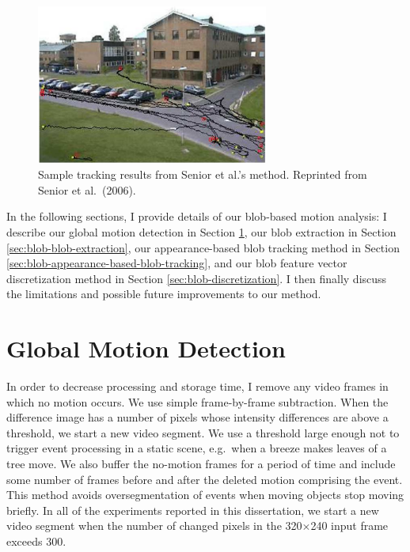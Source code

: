 \begin{figure}[t]
  \centering
  \includegraphics[width=3in]{figures/senior-tracking-results-for-dataset-1.png}
  \caption[Sample tracking results from Senior et al.'s
    method.]{\small Sample tracking results from Senior et al.'s
    method. Reprinted from Senior et al.\ (2006).}
  \label{fig:senior-tracking-results}
\end{figure}

In the following sections, I provide details of our blob-based motion
analysis: I describe our global motion detection in
Section \ref{sec:blob-motion-detection}, our blob extraction in
Section \ref{sec:blob-blob-extraction}, our appearance-based blob tracking 
method 
in Section \ref{sec:blob-appearance-based-blob-tracking}, and our blob
feature vector discretization method in
Section \ref{sec:blob-discretization}. I then finally discuss the
limitations and possible future improvements to our method.

\section{Global Motion Detection}
\label{sec:blob-motion-detection}

In order to decrease processing and storage time, I remove 
any video frames in which no motion occurs.
We use simple frame-by-frame
subtraction. When the difference image has a number of pixels whose
intensity differences are above a threshold, we start a new video
segment. We use a threshold large enough not to trigger event
processing in a static scene, e.g.\ when a breeze makes leaves of a
tree move. We also buffer the no-motion frames for a period of time
and include some number of frames before and after the deleted motion 
comprising the
event. This method avoids oversegmentation of events when moving
objects stop moving briefly.  In all of the experiments reported in
this dissertation, we start a new video segment when the number of
changed pixels in the 320$\times$240 input frame exceeds 300.

